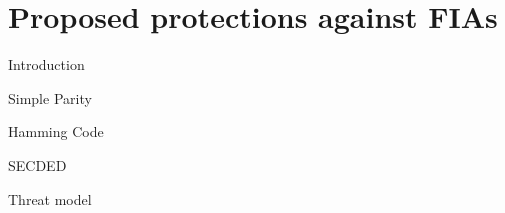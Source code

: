 \section{Proposed protections against FIAs}

\begin{frame}{Introduction}

\end{frame}
\begin{frame}{Simple Parity}
    
\end{frame}
\begin{frame}{Hamming Code}
    
\end{frame}
\begin{frame}{SECDED}
    
\end{frame}
\begin{frame}{Threat model}
    
\end{frame}
